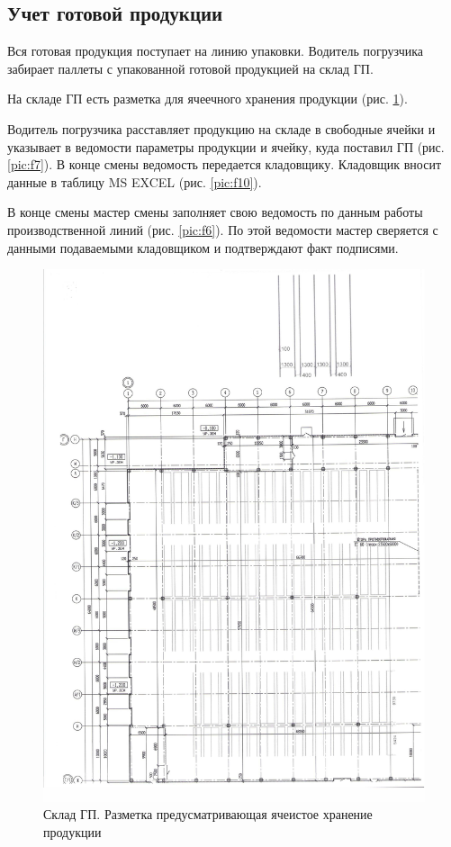 \newpage
\subsection{Учет готовой продукции}
\label{bp:readygoods}


Вся готовая продукция поступает на линию упаковки. Водитель погрузчика забирает паллеты с упакованной готовой продукцией на склад ГП. 

На складе ГП есть разметка для ячеечного хранения продукции (рис. \ref{pic:f5}).

Водитель погрузчика расставляет продукцию на складе в свободные ячейки и указывает в ведомости параметры продукции и ячейку, куда поставил ГП (рис. \ref{pic:f7}). В конце смены ведомость передается кладовщику. Кладовщик вносит данные в таблицу MS EXCEL (рис. \ref{pic:f10}).

В конце смены мастер смены заполняет свою ведомость по данным работы производственной  линий (рис. \ref{pic:f6}). По этой ведомости мастер сверяется с данными подаваемыми кладовщиком и подтверждают факт подписями. 


\begin{figure}
\begin{center}
\includegraphics[height=0.94\textheight, width=\textwidth, keepaspectratio]{Pics/f5.jpg}
\end{center}
\caption{Склад ГП. Разметка предусматривающая ячеистое хранение продукции}
\label{pic:f5}
\end{figure}


